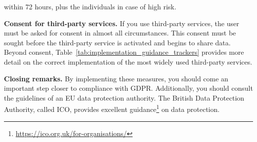 \documentclass[
	12pt,
	a4paper,
	]{scrartcl}
\begin{document}
	within 72 hours, plus the individuals in case of high risk.
	
	\textbf{Consent for third-party services.}
	If you use third-party services, the user must be asked for consent in 
	almost all circumstances.
	This consent must be sought before the third-party service is 
	activated 
	and begins to share data.
	Beyond consent, Table~\ref{tab:implementation_guidance_trackers} 
	provides 
	more detail on the correct implementation of the most widely used 
	third-party services.
	
	\textbf{Closing remarks.}
	By implementing these measures, you should come an important step 
	closer 
	to compliance with GDPR.
	Additionally, you should consult the guidelines of an EU data 
	protection 
	authority.
	The British Data Protection Authority, called ICO, provides excellent 
	guidance\footnote{\url{https://ico.org.uk/for-organisations/}} on data 
	protection.
	
\end{document}
